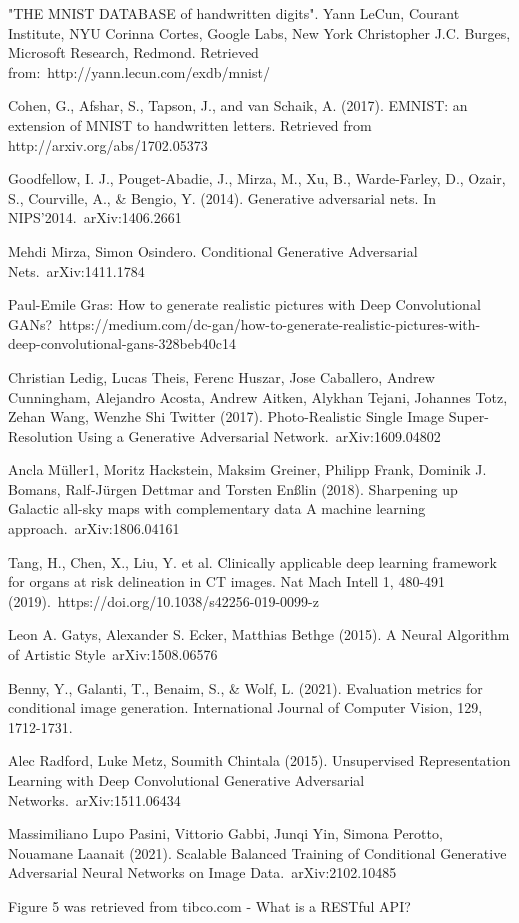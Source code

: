 \documentclass[lettersize,journal]{IEEEtran}
\begin{document}
\begin{thebibliography}{1}


"THE MNIST DATABASE of handwritten digits". Yann LeCun, Courant Institute, NYU Corinna Cortes, Google Labs, New York Christopher J.C. Burges, Microsoft Research, Redmond. Retrieved from:\ http://yann.lecun.com/exdb/mnist/

Cohen, G., Afshar, S., Tapson, J., and van Schaik, A. (2017). EMNIST: an extension of MNIST to handwritten letters. Retrieved from http://arxiv.org/abs/1702.05373

Goodfellow, I. J., Pouget-Abadie, J., Mirza, M., Xu, B., Warde-Farley, D., Ozair, S., Courville, A., \& Bengio, Y. (2014). Generative adversarial nets. In NIPS’2014.\ 	arXiv:1406.2661

Mehdi Mirza, Simon Osindero. Conditional Generative Adversarial Nets.\ 	arXiv:1411.1784

Paul-Emile Gras: How to generate realistic pictures with Deep Convolutional GANs?\ https://medium.com/dc-gan/how-to-generate-realistic-pictures-with-deep-convolutional-gans-328beb40c14


Christian Ledig, Lucas Theis, Ferenc Huszar, Jose Caballero, Andrew Cunningham,
Alejandro Acosta, Andrew Aitken, Alykhan Tejani, Johannes Totz, Zehan Wang, Wenzhe Shi
Twitter (2017). Photo-Realistic Single Image Super-Resolution Using a Generative Adversarial
Network.\ arXiv:1609.04802

Ancla Müller1, Moritz Hackstein, Maksim Greiner, Philipp Frank, Dominik J. Bomans, Ralf-Jürgen Dettmar and Torsten Enßlin (2018). Sharpening up Galactic all-sky maps with complementary data A machine learning approach.\ arXiv:1806.04161

Tang, H., Chen, X., Liu, Y. et al. Clinically applicable deep learning framework for organs at risk delineation in CT images. Nat Mach Intell 1, 480-491 (2019).\ https://doi.org/10.1038/s42256-019-0099-z

Leon A. Gatys, Alexander S. Ecker, Matthias Bethge (2015). A Neural Algorithm of Artistic Style\ arXiv:1508.06576

Benny, Y., Galanti, T., Benaim, S., \& Wolf, L. (2021). Evaluation metrics for conditional image generation. International Journal of Computer Vision, 129, 1712-1731.

Alec Radford, Luke Metz, Soumith Chintala (2015). Unsupervised Representation Learning with Deep Convolutional Generative Adversarial Networks.\ arXiv:1511.06434

Massimiliano Lupo Pasini, Vittorio Gabbi, Junqi Yin, Simona Perotto, Nouamane Laanait (2021). Scalable Balanced Training of Conditional Generative Adversarial Neural Networks on Image Data.\ arXiv:2102.10485

Figure 5 was retrieved from tibco.com - What is a RESTful API?

\end{thebibliography}


\newpage
\end{document}
